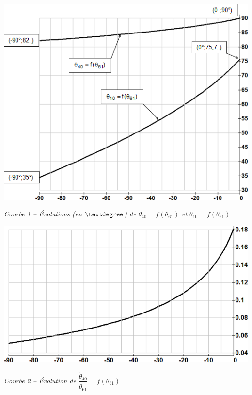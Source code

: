 \documentclass[10pt]{article}
\begin{document}
\begin{minipage}[c]{.48\linewidth}
\begin{center}
\includegraphics[width=\textwidth]{images/ann_2_1}

\textit{Courbe 1 -- Évolutions (en $\textdegree$) de $\theta_{40}=f(\theta_{61})$ et  $\theta_{10}=f(\theta_{61})$}
\end{center}
\end{minipage} \hfill
\begin{minipage}[c]{.48\linewidth}
\begin{center}
\includegraphics[width=\textwidth]{images/ann_2_2}

\textit{Courbe 2 -- Évolution de $\dfrac{\dot{\theta}_{40}}{\dot{\theta}_{61}}=f(\theta_{61})$}
\end{center}
\end{minipage} 
\subparagraph{}
\end{document}
